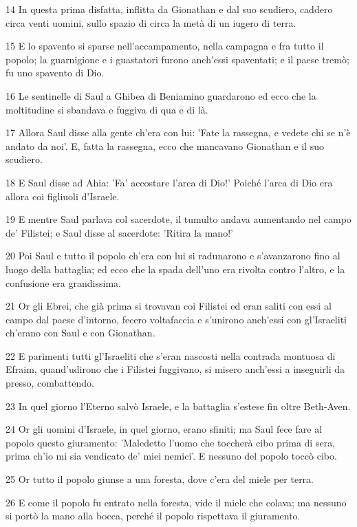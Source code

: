 \par 14 In questa prima disfatta, inflitta da Gionathan e dal suo scudiero, caddero circa venti uomini, sullo spazio di circa la metà di un iugero di terra.
\par 15 E lo spavento si sparse nell'accampamento, nella campagna e fra tutto il popolo; la guarnigione e i guastatori furono anch'essi spaventati; e il paese tremò; fu uno spavento di Dio.
\par 16 Le sentinelle di Saul a Ghibea di Beniamino guardarono ed ecco che la moltitudine si sbandava e fuggiva di qua e di là.
\par 17 Allora Saul disse alla gente ch'era con lui: 'Fate la rassegna, e vedete chi se n'è andato da noi'. E, fatta la rassegna, ecco che mancavano Gionathan e il suo scudiero.
\par 18 E Saul disse ad Ahia: 'Fa' accostare l'arca di Dio!' Poiché l'arca di Dio era allora coi figliuoli d'Israele.
\par 19 E mentre Saul parlava col sacerdote, il tumulto andava aumentando nel campo de' Filistei; e Saul disse al sacerdote: 'Ritira la mano!'
\par 20 Poi Saul e tutto il popolo ch'era con lui si radunarono e s'avanzarono fino al luogo della battaglia; ed ecco che la spada dell'uno era rivolta contro l'altro, e la confusione era grandissima.
\par 21 Or gli Ebrei, che già prima si trovavan coi Filistei ed eran saliti con essi al campo dal paese d'intorno, fecero voltafaccia e s'unirono anch'essi con gl'Israeliti ch'erano con Saul e con Gionathan.
\par 22 E parimenti tutti gl'Israeliti che s'eran nascosti nella contrada montuosa di Efraim, quand'udirono che i Filistei fuggivano, si misero anch'essi a inseguirli da presso, combattendo.
\par 23 In quel giorno l'Eterno salvò Israele, e la battaglia s'estese fin oltre Beth-Aven.
\par 24 Or gli uomini d'Israele, in quel giorno, erano sfiniti; ma Saul fece fare al popolo questo giuramento: 'Maledetto l'uomo che toccherà cibo prima di sera, prima ch'io mi sia vendicato de' miei nemici'. E nessuno del popolo toccò cibo.
\par 25 Or tutto il popolo giunse a una foresta, dove c'era del miele per terra.
\par 26 E come il popolo fu entrato nella foresta, vide il miele che colava; ma nessuno si portò la mano alla bocca, perché il popolo rispettava il giuramento.

